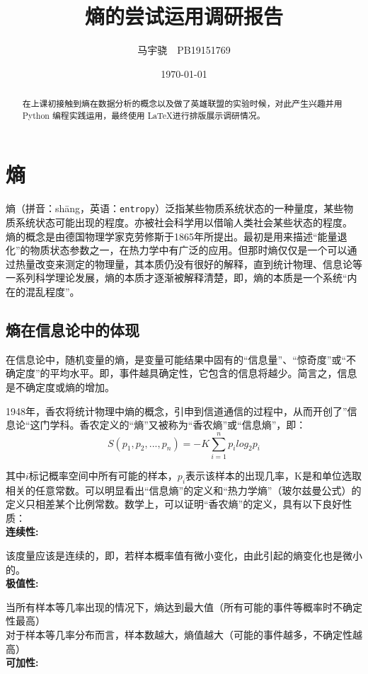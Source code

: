 \documentclass[lang=cn,11pt]{elegantpaper}
\title{\heiti \LARGE 熵的尝试运用调研报告}
\author{马宇骁~~PB19151769}
\date{\today}
\begin{document}
\maketitle

\begin{abstract}
\noindent \qquad 在上课初接触到熵在数据分析的概念以及做了英雄联盟的实验时候，对此产生兴趣并用Python 编程实践运用，最终使用 \LaTeX{}进行排版展示调研情况。
\end{abstract}


\section{熵}

熵（拼音：sh\={a}ng，英语：\lstinline{entropy}）泛指某些物质系统状态的一种量度，某些物质系统状态可能出现的程度。亦被社会科学用以借喻人类社会某些状态的程度。  熵的概念是由德国物理学家克劳修斯于1865年所提出。最初是用来描述“能量退化”的物质状态参数之一，在热力学中有广泛的应用。但那时熵仅仅是一个可以通过热量改变来测定的物理量，其本质仍没有很好的解释，直到统计物理、信息论等一系列科学理论发展，熵的本质才逐渐被解释清楚，即，熵的本质是一个系统“内在的混乱程度”。
      
\subsection{熵在信息论中的体现}
在信息论中，随机变量的熵，是变量可能结果中固有的“信息量”、“惊奇度”或“不确定度”的平均水平。即，事件越具确定性，它包含的信息将越少。简言之，信息是不确定度或熵的增加。

1948年，香农将统计物理中熵的概念，引申到信道通信的过程中，从而开创了”信息论“这门学科。香农定义的“熵”又被称为“香农熵”或“信息熵”，即：\\
\begin{equation}
S(p_1,p_2,...,p_n) = -K\sum_{i=1}^{n} p_i log_2 p_i\label{eq:binom}
\end{equation}

其中$i$标记概率空间中所有可能的样本，$p_{i}$表示该样本的出现几率，K是和单位选取相关的任意常数。可以明显看出“信息熵”的定义和“热力学熵”（玻尔兹曼公式）的定义只相差某个比例常数。数学上，可以证明“香农熵”的定义，具有以下良好性质：\\
\textbf{连续性:}

该度量应该是连续的，即，若样本概率值有微小变化，由此引起的熵变化也是微小的。\\
\textbf{极值性:}

当所有样本等几率出现的情况下，熵达到最大值（所有可能的事件等概率时不确定性最高）\\
对于样本等几率分布而言，样本数越大，熵值越大（可能的事件越多，不确定性越高）\\
\textbf{可加性:}
\end{document}
